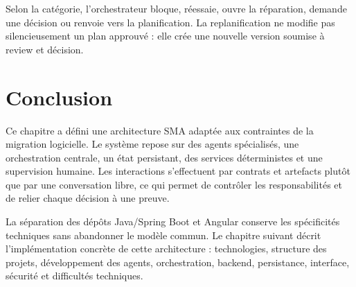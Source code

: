 Selon la catégorie, l'orchestrateur bloque, réessaie, ouvre la réparation, demande une décision ou renvoie vers la planification. La replanification ne modifie pas silencieusement un plan approuvé : elle crée une nouvelle version soumise à review et décision.

\section*{Conclusion}

Ce chapitre a défini une architecture SMA adaptée aux contraintes de la migration logicielle. Le système repose sur des agents spécialisés, une orchestration centrale, un état persistant, des services déterministes et une supervision humaine. Les interactions s'effectuent par contrats et artefacts plutôt que par une conversation libre, ce qui permet de contrôler les responsabilités et de relier chaque décision à une preuve.

La séparation des dépôts Java/Spring Boot et Angular conserve les spécificités techniques sans abandonner le modèle commun. Le chapitre suivant décrit l'implémentation concrète de cette architecture : technologies, structure des projets, développement des agents, orchestration, backend, persistance, interface, sécurité et difficultés techniques.
